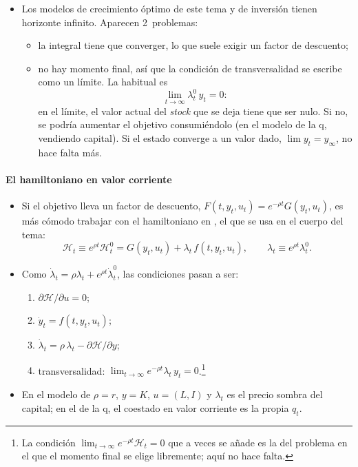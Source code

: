 \documentclass[11pt]{article}
\begin{document}
\begin{itemize}
\item Los modelos de crecimiento óptimo de este tema y de inversión  tienen horizonte infinito. Aparecen 2~problemas:
  \begin{itemize}
  \item la integral tiene que converger, lo que suele exigir un factor de descuento;
  \item no hay momento final, así que la condición de transversalidad se escribe como un límite. La habitual es
    \begin{equation*}
    \lim_{t\to\infty}\lambda^0_t\,y_t=0:
    \end{equation*}
    en el límite, el valor actual del \emph{stock} que se deja tiene que ser nulo. Si no, se podría aumentar el objetivo consumiéndolo (en el modelo de la q, vendiendo capital). Si el estado converge a un valor dado, $\lim y_t=y_{\infty}$, no hace falta más.
  \end{itemize}
\end{itemize}

\paragraph{El hamiltoniano en valor corriente}

\begin{itemize}
\item Si el objetivo lleva un factor de descuento, $F(t,y_t,u_t)=e^{-\rho t}G(y_t,u_t)$, es más cómodo trabajar con el hamiltoniano en , el que se usa en el cuerpo del tema:
  \begin{equation*}
  \mathcal{H}_t\equiv e^{\rho t}\mathcal{H}^0_t=G(y_t,u_t)+\lambda_t\,f(t,y_t,u_t),\qquad \lambda_t\equiv e^{\rho t}\lambda^0_t.
  \end{equation*}
\item Como $\dot\lambda_t=\rho\lambda_t+e^{\rho t}\dot\lambda^0_t$, las condiciones pasan a ser:
  \begin{enumerate}
  \item $\partial\mathcal{H}/\partial u=0$;
  \item $\dot y_t=f(t,y_t,u_t)$;
  \item $\dot\lambda_t=\rho\,\lambda_t-\partial\mathcal{H}/\partial y$;
  \item transversalidad: $\lim_{t\to\infty}e^{-\rho t}\lambda_t\,y_t=0$.\footnote{La condición $\lim_{t\to\infty}e^{-\rho t}\mathcal{H}_t=0$ que a veces se añade es la del problema en el que el momento final se elige libremente; aquí no hace falta.}
  \end{enumerate}
\item En el modelo de  $\rho=r$, $y=K$, $u=(L,I)$ y $\lambda_t$ es el precio sombra del capital; en el de la q, el coestado en valor corriente es la propia $q_t$.
\end{itemize}
\end{document}
